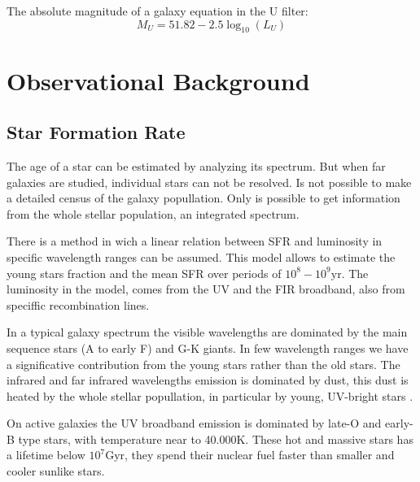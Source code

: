 \documentclass{emulateapj}
\begin{document}
  The absolute magnitude of a galaxy equation in the U filter:
  \[ M_{U} = 51.82 - 2.5 \log_{10}(L_{U}) \]




\section{Observational Background}
\label{sec:theo}

\subsection{Star Formation Rate}

The age of a star can be estimated by analyzing its spectrum. But when far
galaxies are studied, individual stars can not be resolved. Is not 
possible to make a detailed census of the galaxy popullation. Only is possible 
to get information from the whole stellar population, an integrated spectrum.

There is a  method\citep{madau98} in wich a linear relation between SFR
and luminosity in specific wavelength ranges can be assumed. This model allows
to estimate the young stars fraction and the mean SFR over periods of $10^8 -
10^9 \textrm{yr}$\citep{kennicutt98}. The luminosity in the model, comes from
the UV and the FIR broadband, also from speciffic recombination lines.



In a typical galaxy spectrum the visible wavelengths are dominated by the main 
sequence stars (A to early F) and G-K giants. In few wavelength ranges we have 
a significative contribution from the young stars rather than the old stars. 
The infrared and far infrared wavelengths emission is dominated by dust, this 
dust is  heated by the whole stellar popullation, in particular by young, 
UV-bright stars \citep{law11}.

On active galaxies the UV broadband emission is dominated by late-O
and early-B type stars, with temperature near to 40.000K. These hot and massive
stars has a lifetime below $10^7\textrm{Gyr}$, they spend their nuclear fuel
faster than smaller and cooler sunlike stars.
\end{document}
